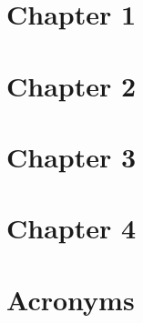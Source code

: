 \documentclass[12pt, a4paper]{article}
\begin{document}
\begin{multicols*}{2}
	\section{Chapter 1}
	
	
	\section{Chapter 2}
	
	
	
	\section{Chapter 3}
	
	
	
	\section{Chapter 4}
	
	
	\newpage
	\section{Acronyms}
	


\end{multicols*}	
\end{document}
